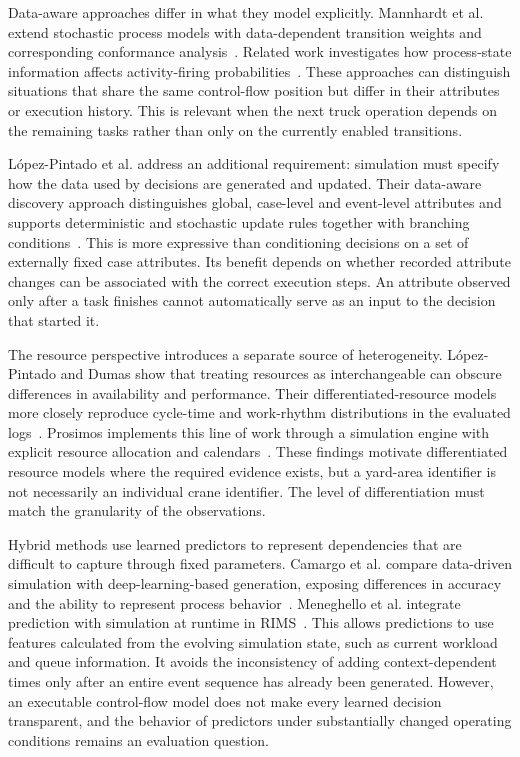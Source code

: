 Data-aware approaches differ in what they model explicitly. Mannhardt et al. extend stochastic process models with data-dependent transition weights and corresponding conformance analysis~\cite{mannhardt2023stochasticProcessesModelling}. Related work investigates how process-state information affects activity-firing probabilities~\cite{Vinci2023Inf.Activ.Prob}. These approaches can distinguish situations that share the same control-flow position but differ in their attributes or execution history. This is relevant when the next truck operation depends on the remaining tasks rather than only on the currently enabled transitions.

L\'opez-Pintado et al. address an additional requirement: simulation must specify how the data used by decisions are generated and updated. Their data-aware discovery approach distinguishes global, case-level and event-level attributes and supports deterministic and stochastic update rules together with branching conditions~\cite{lopez2024}. This is more expressive than conditioning decisions on a set of externally fixed case attributes. Its benefit depends on whether recorded attribute changes can be associated with the correct execution steps. An attribute observed only after a task finishes cannot automatically serve as an input to the decision that started it.

The resource perspective introduces a separate source of heterogeneity. L\'opez-Pintado and Dumas show that treating resources as interchangeable can obscure differences in availability and performance. Their differentiated-resource models more closely reproduce cycle-time and work-rhythm distributions in the evaluated logs~\cite{BPSdifferentiatedResources2022}. Prosimos implements this line of work through a simulation engine with explicit resource allocation and calendars~\cite{Prosimos2023}. These findings motivate differentiated resource models where the required evidence exists, but a yard-area identifier is not necessarily an individual crane identifier. The level of differentiation must match the granularity of the observations.

Hybrid methods use learned predictors to represent dependencies that are difficult to capture through fixed parameters. Camargo et al. compare data-driven simulation with deep-learning-based generation, exposing differences in accuracy and the ability to represent process behavior~\cite{Camargo2021}. Meneghello et al. integrate prediction with simulation at runtime in RIMS~\cite{runtimeIntegration2024}. This allows predictions to use features calculated from the evolving simulation state, such as current workload and queue information. It avoids the inconsistency of adding context-dependent times only after an entire event sequence has already been generated. However, an executable control-flow model does not make every learned decision transparent, and the behavior of predictors under substantially changed operating conditions remains an evaluation question.

